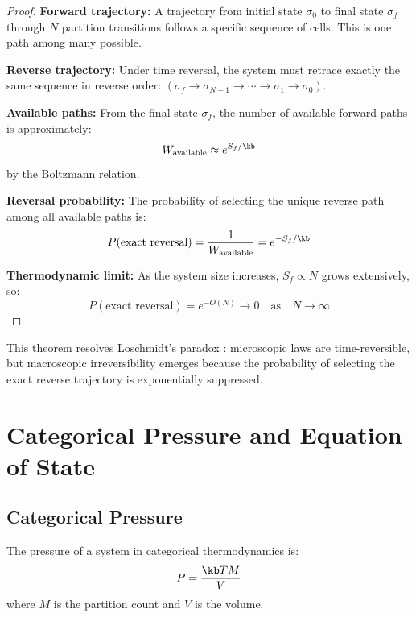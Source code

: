 \begin{proof}
\textbf{Forward trajectory:} A trajectory from initial state $\sigma_0$ to final state $\sigma_f$ through $N$ partition transitions follows a specific sequence of cells. This is one path among many possible.

\textbf{Reverse trajectory:} Under time reversal, the system must retrace exactly the same sequence in reverse order: $(\sigma_f \to \sigma_{N-1} \to \cdots \to \sigma_1 \to \sigma_0)$.

\textbf{Available paths:} From the final state $\sigma_f$, the number of available forward paths is approximately:
\begin{equation}
W_{\text{available}} \approx e^{S_f/\kb}
\end{equation}
by the Boltzmann relation.

\textbf{Reversal probability:} The probability of selecting the unique reverse path among all available paths is:
\begin{equation}
P(\text{exact reversal}) = \frac{1}{W_{\text{available}}} = e^{-S_f/\kb}
\end{equation}

\textbf{Thermodynamic limit:} As the system size increases, $S_f \propto N$ grows extensively, so:
\begin{equation}
P(\text{exact reversal}) = e^{-O(N)} \to 0 \quad \text{as} \quad N \to \infty
\end{equation}
\end{proof}

This theorem resolves Loschmidt's paradox \cite{loschmidt1876}: microscopic laws are time-reversible, but macroscopic irreversibility emerges because the probability of selecting the exact reverse trajectory is exponentially suppressed.

\section{Categorical Pressure and Equation of State}

\subsection{Categorical Pressure}

\begin{theorem}
\label{thm:pressure}
The pressure of a system in categorical thermodynamics is:
\begin{equation}
P = \frac{\kb T M}{V}
\label{eq:categorical_pressure}
\end{equation}
where $M$ is the partition count and $V$ is the volume.
\end{theorem}

